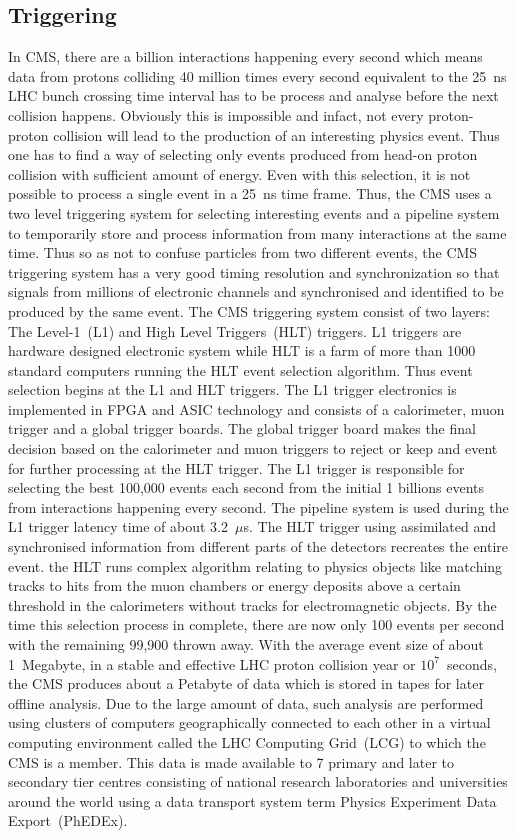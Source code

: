 \subsection{Triggering}
In CMS, there are a billion interactions happening every second which means data from protons colliding 40 million times every second equivalent to the 25~ns LHC bunch crossing time interval has to be process and analyse before the next collision happens. Obviously this is impossible and infact, not every proton-proton collision will lead to the production of an interesting physics event. Thus one has to find a way of selecting only events produced from head-on proton collision with sufficient amount of energy. Even with this selection, it is not possible to process a single event in a 25~ns time frame. Thus, the CMS uses a two level triggering system for selecting interesting events and a pipeline system to temporarily store and process information from many interactions at the same time. Thus so as not to confuse particles from two different events, the CMS triggering system has a very good timing resolution and synchronization so that signals from millions of electronic channels and synchronised and identified to be produced by the same event.
The CMS triggering system consist of two layers: The Level-1~(L1) and High Level Triggers~(HLT) triggers. L1 triggers are hardware designed electronic system while HLT is a farm of more than 1000 standard computers running the HLT event selection algorithm. Thus event selection begins at the L1 and HLT triggers.
The L1 trigger electronics is implemented in FPGA and ASIC technology and consists of a calorimeter, muon trigger and a global trigger boards. The global trigger board makes the final decision based on the calorimeter and muon triggers to reject or keep and event for further processing at the HLT trigger. The L1 trigger is responsible for selecting the best 100,000 events each second from the initial 1 billions events from interactions happening every second. The pipeline system is used during the L1 trigger latency time of about 3.2~$\mu$s.
The HLT trigger using assimilated and synchronised information from different parts of the detectors recreates the entire event. the HLT runs complex algorithm relating to physics objects like matching tracks to hits from the muon chambers  or energy deposits above a certain threshold in the calorimeters without tracks for electromagnetic objects. By the time this selection process in complete, there are now only 100 events per second with the remaining 99,900 thrown away.
With the average event size of about 1~Megabyte, in a stable and effective LHC proton collision year or $10^{7}$~seconds, the CMS produces about a Petabyte of data which is stored in tapes for later offline analysis. Due to the large amount of data, such analysis are performed using clusters of computers geographically connected to each other in a virtual computing environment called the LHC Computing Grid~(LCG) to which the CMS is a member. This data is made available to 7 primary and later to secondary tier centres consisting of national research laboratories and universities around the world using a data transport system term Physics Experiment Data Export~(PhEDEx).
\label{Collider_And_Detector_chapter}
